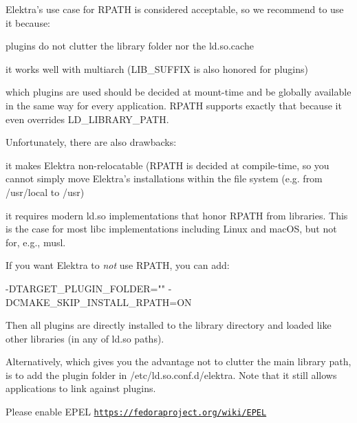 Elektra’s use case for {\ttfamily R\+P\+A\+TH} is considered acceptable, so we recommend to use it because\+:


\begin{DoxyItemize}
\item plugins do not clutter the library folder nor the {\ttfamily ld.\+so.\+cache}
\item it works well with multiarch ({\ttfamily L\+I\+B\+\_\+\+S\+U\+F\+F\+IX} is also honored for plugins)
\item which plugins are used should be decided at mount-\/time and be globally available in the same way for every application. {\ttfamily R\+P\+A\+TH} supports exactly that because it even overrides {\ttfamily L\+D\+\_\+\+L\+I\+B\+R\+A\+R\+Y\+\_\+\+P\+A\+TH}.
\end{DoxyItemize}

Unfortunately, there are also drawbacks\+:


\begin{DoxyItemize}
\item it makes Elektra non-\/relocatable ({\ttfamily R\+P\+A\+TH} is decided at compile-\/time, so you cannot simply move Elektra’s installations within the file system (e.\+g. from {\ttfamily /usr/local} to {\ttfamily /usr})
\item it requires modern {\ttfamily ld.\+so} implementations that honor {\ttfamily R\+P\+A\+TH} from libraries. This is the case for most {\ttfamily libc} implementations including Linux and mac\+OS, but not for, e.\+g., {\ttfamily musl}.
\end{DoxyItemize}

If you want Elektra to {\itshape not} use {\ttfamily R\+P\+A\+TH}, you can add\+:


\begin{DoxyCode}
-DTARGET\_PLUGIN\_FOLDER="" -DCMAKE\_SKIP\_INSTALL\_RPATH=ON
\end{DoxyCode}


Then all plugins are directly installed to the library directory and loaded like other libraries (in any of {\ttfamily ld.\+so} paths).

Alternatively, which gives you the advantage not to clutter the main library path, is to add the plugin folder in {\ttfamily /etc/ld.so.\+conf.\+d/elektra}. Note that it still allows applications to link against plugins.

Please enable E\+P\+EL \href{https://fedoraproject.org/wiki/EPEL}{\tt https\+://fedoraproject.\+org/wiki/\+E\+P\+EL}


